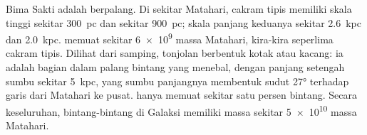 Bima Sakti adalah  berpalang. Di sekitar Matahari, cakram tipis
memiliki skala tinggi sekitar \qty{300}{pc} dan 
sekitar \qty{900}{pc}; skala panjang keduanya sekitar \qty{2.6}{kpc} dan
\qty{2.0}{kpc}.  memuat sekitar \num{6e9} massa Matahari,
kira-kira seperlima cakram tipis. Dilihat dari samping, tonjolan berbentuk kotak
atau kacang: ia adalah bagian dalam palang bintang yang menebal, dengan
panjang setengah sumbu sekitar \qty{5}{kpc}, yang sumbu panjangnya membentuk
sudut \ang{27} terhadap garis dari Matahari ke pusat.  hanya memuat
sekitar satu persen bintang. Secara keseluruhan, bintang-bintang di Galaksi
memiliki massa sekitar \num{5e10} massa Matahari.

